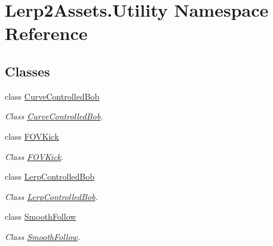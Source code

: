 \hypertarget{namespace_lerp2_assets_1_1_utility}{}\section{Lerp2\+Assets.\+Utility Namespace Reference}
\label{namespace_lerp2_assets_1_1_utility}
\subsection*{Classes}
\begin{DoxyCompactItemize}
\item 
class \hyperlink{class_lerp2_assets_1_1_utility_1_1_curve_controlled_bob}{Curve\+Controlled\+Bob}
\begin{DoxyCompactList}\small\item\em Class \hyperlink{class_lerp2_assets_1_1_utility_1_1_curve_controlled_bob}{Curve\+Controlled\+Bob}. \end{DoxyCompactList}\item 
class \hyperlink{class_lerp2_assets_1_1_utility_1_1_f_o_v_kick}{F\+O\+V\+Kick}
\begin{DoxyCompactList}\small\item\em Class \hyperlink{class_lerp2_assets_1_1_utility_1_1_f_o_v_kick}{F\+O\+V\+Kick}. \end{DoxyCompactList}\item 
class \hyperlink{class_lerp2_assets_1_1_utility_1_1_lerp_controlled_bob}{Lerp\+Controlled\+Bob}
\begin{DoxyCompactList}\small\item\em Class \hyperlink{class_lerp2_assets_1_1_utility_1_1_lerp_controlled_bob}{Lerp\+Controlled\+Bob}. \end{DoxyCompactList}\item 
class \hyperlink{class_lerp2_assets_1_1_utility_1_1_smooth_follow}{Smooth\+Follow}
\begin{DoxyCompactList}\small\item\em Class \hyperlink{class_lerp2_assets_1_1_utility_1_1_smooth_follow}{Smooth\+Follow}. \end{DoxyCompactList}\end{DoxyCompactItemize}
